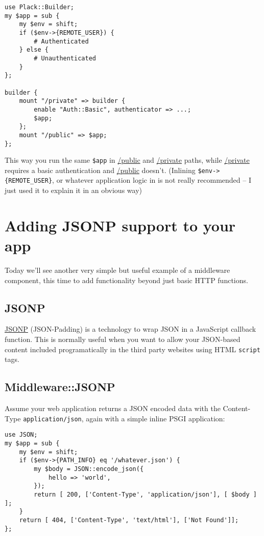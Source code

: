 \begin{lstlisting}
use Plack::Builder;
my $app = sub {
    my $env = shift;
    if ($env->{REMOTE_USER}) { 
        # Authenticated
    } else {
        # Unauthenticated
    }
};

builder {
    mount "/private" => builder {
        enable "Auth::Basic", authenticator => ...;
        $app;
    };
    mount "/public" => $app;
};
\end{lstlisting}

This way you run the same \lstinline!$app! in \url{/public} and
\url{/private} paths, while \url{/private} requires a basic authentication
and \url{/public} doesn't. (Inlining \lstinline!$env->{REMOTE_USER}!, or
whatever application logic in  is not really recommended -- I just
used it to explain it in an obvious way)

\chapter{Adding JSONP support to your
app}\label{day-16-adding-jsonp-support-to-your-app}

Today we'll see another very simple but useful example of a middleware
component, this time to add functionality beyond just basic HTTP
functions.

\section{JSONP}\label{jsonp}

\href{http://ajaxian.com/archives/jsonp-json-with-padding}{JSONP}
(JSON-Padding) is a technology to wrap JSON in a JavaScript callback
function. This is normally useful when you want to allow your JSON-based
content included programatically in the third party websites using HTML
\lstinline!script! tags.

\section{Middleware::JSONP}\label{middlewarejsonp}

Assume your web application returns a JSON encoded data with the
Content-Type \lstinline!application/json!, again with a simple inline
PSGI application:

\begin{lstlisting}
use JSON;
my $app = sub {
    my $env = shift;
    if ($env->{PATH_INFO} eq '/whatever.json') {
        my $body = JSON::encode_json({
            hello => 'world',
        });
        return [ 200, ['Content-Type', 'application/json'], [ $body ] ];
    }
    return [ 404, ['Content-Type', 'text/html'], ['Not Found']];
};
\end{lstlisting}

